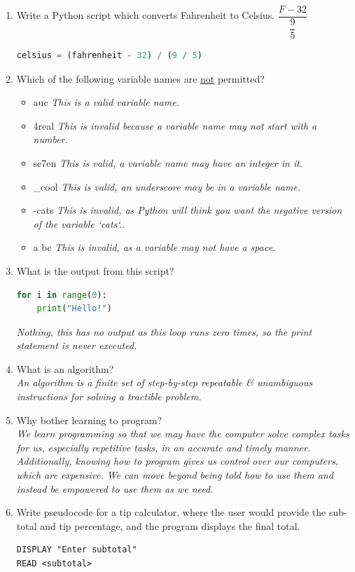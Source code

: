 \documentclass[letter,10pt]{article}
\newcommand*\tick{\item[\Checkmark]}
\newcommand*\fail{\item[\XSolidBrush]}
\begin{document}
\begin{enumerate}
    \item Write a Python script which converts Fahrenheit to Celsius. $\dfrac{F - 32}{\dfrac{9}{5}}$
    \begin{lstlisting}[language=python]
celsius = (fahrenheit - 32) / (9 / 5)
    \end{lstlisting}
    
    \item Which of the following variable names are \underline{not} permitted?
    \begin{itemize}
        \fail auc \textit{This is a valid variable name.}
        \tick 4real \textit{This is invalid because a variable name may not start with a number.}
        \fail se7en \textit{This is valid, a variable name may have an integer in it.}
        \fail \_cool \textit{This is valid, an underscore may be in a variable name.}
        \tick -cats \textit{This is invalid, as Python will think you want the negative version of the variable `cats`.}.
        \tick a bc \textit{This is invalid, as a variable may not have a space.}
    \end{itemize}

    \item What is the output from this script?
    \begin{lstlisting}[language=python]
for i in range(0):
    print("Hello!")
    \end{lstlisting}
    \textit{Nothing, this has no output as this loop runs zero times, so the print statement is never executed.}
    
    \item What is an algorithm? \\
    \textit{An algorithm is a finite set of step-by-step repeatable \& unambiguous instructions for solving a tractible problem.}
    
    \item Why bother learning to program? \\
    \textit{We learn programming so that we may have the computer solve complex tasks for us, especially repetitive tasks, in an accurate and timely manner. Additionally, knowing how to program gives us control over our computers, which are expensive. We can move beyond being told how to use them and instead be empowered to use them as we need.}
    
    \item Write pseudocode for a tip calculator, where the user would provide the sub-total and tip percentage, and the program displays the final total.
    \begin{verbatim}
DISPLAY "Enter subtotal"
READ <subtotal>


\end{verbatim}
\end{enumerate}
\end{document}
